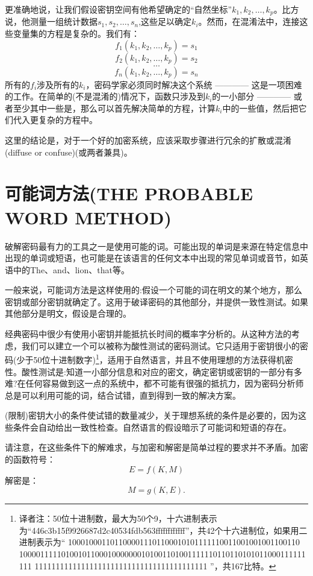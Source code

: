 \documentclass[]{article}
\begin{document}
更准确地说，让我们假设密钥空间有他希望确定的“自然坐标”$k_1,k_2,\ldots,k_p$。比方说，他测量一组统计数据$s_1,s_2,\ldots,s_n$,这些足以确定$k_i$。然而，在混淆法中，连接这些变量集的方程是复杂的。我们有：
\[f_1(k_1,k_2,\ldots,k_p)=s_1\]
\[f_2(k_1,k_2,\ldots,k_p)=s_2\]
\[\ldots\]
\[f_n(k_1,k_2,\ldots,k_p)=s_n\]
所有的$f_i$涉及所有的$k_i$，密码学家必须同时解决这个系统 ———— 这是一项困难的工作。在简单的(不是混淆的)情况下，函数只涉及到$k_i$的一小部分 ———— 或者至少其中一些是，那么可以首先解决简单的方程，计算$k_i$中的一些值，然后把它们代入更复杂的方程中。

这里的结论是，对于一个好的加密系统，应该采取步骤进行冗余的扩散或混淆(diffuse or confuse)(或两者兼具)。


\newpage
%   
%


\section{可能词方法(THE PROBABLE WORD METHOD)}


破解密码最有力的工具之一是使用可能的词。可能出现的单词是来源在特定信息中出现的单词或短语，也可能是在该语言的任何文本中出现的常见单词或音节，如英语中的The、and、lion、that等。

一般来说，可能词方法是这样使用的:假设一个可能的词在明文的某个地方，那么密钥或部分密钥就确定了。这用于破译密码的其他部分，并提供一致性测试。如果其他部分是明文，假设是合理的。

经典密码中很少有使用小密钥并能抵抗长时间的概率字分析的。从这种方法的考虑，我们可以建立一个可以被称为酸性测试的密码测试。它只适用于密钥很小的密码(少于50位十进制数字)\footnote{译者注：50位十进制数，最大为50个9，十六进制表示为“446c3b15f9926687d2c40534fdb563ffffffffffff”，共42个十六进制位，如果用二进制表示为“ 1000100011011000011101100010101111110011001001001100110
	10000111110100101100010000000101001101001111110110110101011000111111111
	11111111111111111111111111111111111111111 ”，共167比特。}，适用于自然语言，并且不使用理想的方法获得机密性。酸性测试是:知道一小部分信息和对应的密文，确定密钥或密钥的一部分有多难?在任何容易做到这一点的系统中，都不可能有很强的抵抗力，因为密码分析师总是可以利用可能的词，结合试错，直到得到一致的解决方案。


(限制)密钥大小的条件使试错的数量减少，关于理想系统的条件是必要的，因为这些条件会自动给出一致性检查。自然语言的假设暗示了可能词和短语的存在。

请注意，在这些条件下的解难求，与加密和解密是简单过程的要求并不矛盾。加密的函数符号：
\[E=f(K,M)\]
解密是：
\[M=g(K,E).\]
\end{document}

